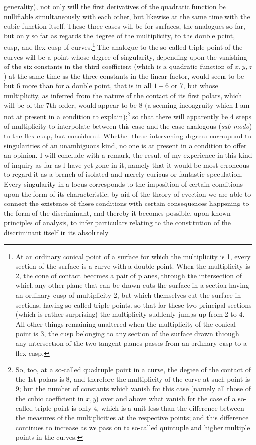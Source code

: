 \documentclass[11pt]{article}
\newcommand{\sourcepage}[1]{\marginpar{\scriptsize p.~#1}}
\begin{document}
{{\sourcepage{375}
generality), not only will the first derivatives of the quadratic function be nullifiable simultaneously with each other, but likewise at the same time with the cubic function itself. These three cases will be for surfaces, the analogues so far, but only so far as regards the degree of the multiplicity, to the double point, cusp, and flex-cusp of curves.\footnote{At an ordinary conical point of a surface for which the multiplicity is 1, every section of the surface is a curve with a double point. When the multiplicity is 2, the cone of contact becomes a pair of planes, through the intersection of which any other plane that can be drawn cuts the surface in a section having an ordinary cusp of multiplicity 2, but which themselves cut the surface in sections, having so-called triple points, so that for these two principal sections (which is rather surprising) the multiplicity suddenly jumps up from 2 to 4. All other things remaining unaltered when the multiplicity of the conical point is 3, the cusp belonging to any section of the surface drawn through any intersection of the two tangent planes passes from an ordinary cusp to a flex-cusp.} The analogue to the so-called triple point of the curves will be a point whose degree of singularity, depending upon the vanishing of the six constants in the third coefficient (which is a quadratic function of $x,y,z$) at the same time as the three constants in the linear factor, would seem to be but 6 more than for a double point, that is in all $1+6$ or 7, but whose multiplicity, as inferred from the nature of the contact of its first polars, which will be of the 7th order, would appear to be 8 (a seeming incongruity which I am not at present in a condition to explain);\footnote{So, too, at a so-called quadruple point in a curve, the degree of the contact of the 1st polars is 8, and therefore the multiplicity of the curve at such point is 9; but the number of constants which vanish for this case (namely all those of the cubic coefficient in $x,y$) over and above what vanish for the case of a so-called triple point is only 4, which is a unit less than the difference between the measures of the multiplicities at the respective points; and this difference continues to increase as we pass on to so-called quintuple and higher multiple points in the curves.} so that there will apparently be 4 steps of multiplicity to interpolate between this case and the case analogous (\emph{sub modo}) to the flex-cusp, last considered. Whether these intervening degrees correspond to singularities of an unambiguous kind, no one is at present in a condition to offer an opinion. I will conclude with a remark, the result of my experience in this kind of inquiry as far as I have yet gone in it, namely that it would be most erroneous to regard it as a branch of isolated and merely curious or fantastic speculation. Every singularity in a locus corresponds to the imposition of certain conditions upon the form of its characteristic; by aid of the theory of evection we are able to connect the existence of these conditions with certain consequences happening to the form of the discriminant, and thereby it becomes possible, upon known principles of analysis, to infer particulars relating to the constitution of the discriminant itself in its absolutely }}
\end{document}

